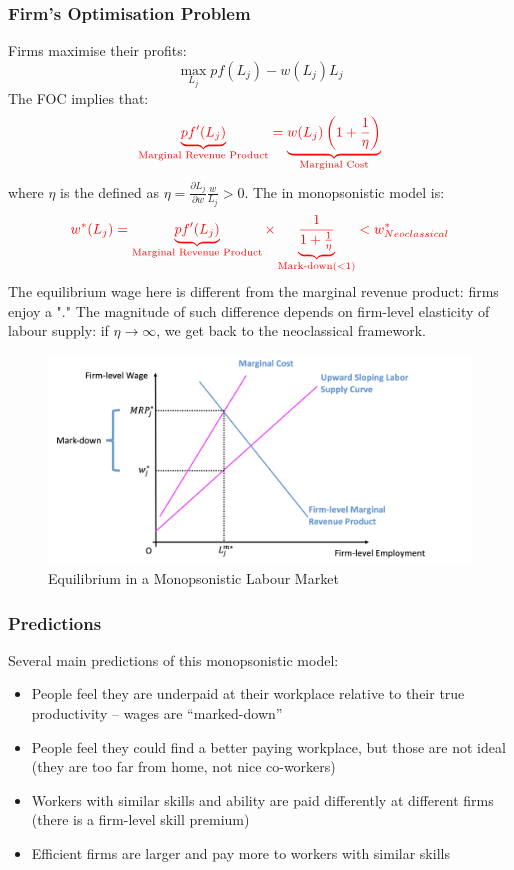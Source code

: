         \subsubsection{Firm's Optimisation Problem}
            Firms maximise their profits:
            $$\max_{L_j} pf(L_j) - w(L_j)L_j$$
            The FOC implies that:
            $$\color{red} \underbrace{pf'(L_j)}_{\text{Marginal\ Revenue\ Product}} = \underbrace{w(L_j)\left(1+\frac{1}{\eta}\right)}_{\text{Marginal\ Cost}}$$where $\eta$ is the  defined as $\eta = \frac{\partial L_j}{\partial w}\frac{w}{L_j} > 0$.
            The  in monopsonistic model is:
            $$\color{red} w^*(L_j)= \underbrace{pf'(L_j)}_{\text{Marginal\ Revenue\ Product}} \times \underbrace{\frac{1}{1+\frac{1}{\eta}}}_{\text{Mark-down}(<1)} < w^*_{Neoclassical}$$
            The equilibrium wage here is different from the marginal revenue product: firms enjoy a "." The magnitude of such difference depends on firm-level elasticity of labour supply: if $\eta \rightarrow \infty$, we get back to the neoclassical framework.
            \begin{figure}[H]
                \centering
                \includegraphics[width=5in]{images/ch2/Monop_LM_1.png}
                \caption{Equilibrium in a Monopsonistic Labour Market}
            \end{figure}
            
        \subsubsection{Predictions}
            Several main predictions of this monopsonistic model:
            \begin{itemize}
                \item People feel they are underpaid at their workplace relative to their true productivity – wages are “marked-down”
                \item People feel they could find a better paying workplace, but those are not ideal (they are too far from home, not nice co-workers)
                \item Workers with similar skills and ability are paid differently at different firms (there is a firm-level skill premium)
                \item Efficient firms are larger and pay more to workers with similar skills
            \end{itemize}
    
